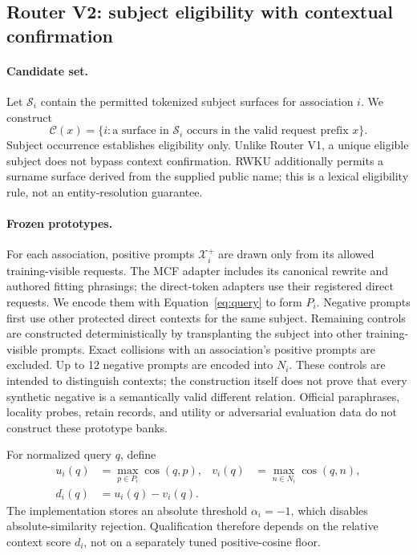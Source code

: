 \documentclass{article}
\begin{document}
\subsection{Router V2: subject eligibility with contextual confirmation}
\label{sec:router}

\paragraph{Candidate set.}
Let $\mathcal{S}_i$ contain the permitted tokenized subject surfaces for
association $i$. We construct
\begin{equation}
 \mathcal{C}(x)=\{i:\text{a surface in }\mathcal{S}_i
                  \text{ occurs in the valid request prefix }x\}.
 \label{eq:candidates}
\end{equation}
Subject occurrence establishes eligibility only. Unlike Router V1, a unique
eligible subject does not bypass context confirmation. RWKU additionally
permits a surname surface derived from the supplied public name; this is a
lexical eligibility rule, not an entity-resolution guarantee.

\paragraph{Frozen prototypes.}
For each association, positive prompts $\mathcal{X}_i^+$ are drawn only from
its allowed training-visible requests. The MCF adapter includes its canonical
rewrite and authored fitting phrasings; the direct-token adapters use their
registered direct requests. We encode them with Equation~\eqref{eq:query} to
form $P_i$. Negative prompts first use other protected direct contexts for the
same subject. Remaining controls are constructed deterministically by
transplanting the subject into other training-visible prompts. Exact collisions
with an association's positive prompts are excluded. Up to 12 negative prompts
are encoded into $N_i$. These controls are intended to distinguish contexts;
the construction itself does not prove that every synthetic negative is a
semantically valid different relation. Official paraphrases, locality probes,
retain records, and utility or adversarial evaluation data do not construct
these prototype banks.

For normalized query $q$, define
\begin{align}
 u_i(q)&=\max_{p\in P_i}\cos(q,p),
 &v_i(q)&=\max_{n\in N_i}\cos(q,n),\nonumber\\
 d_i(q)&=u_i(q)-v_i(q).
 \label{eq:score}
\end{align}
The implementation stores an absolute threshold $\alpha_i=-1$, which disables
absolute-similarity rejection. Qualification therefore depends on the relative
context score $d_i$, not on a separately tuned positive-cosine floor.
\end{document}
